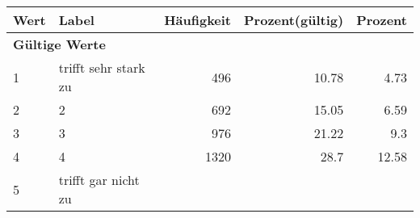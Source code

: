      \begin{longtable}{lXrrr}
     \toprule
     \textbf{Wert} & \textbf{Label} & \textbf{Häufigkeit} & \textbf{Prozent(gültig)} & \textbf{Prozent} \\
     \endhead
     \midrule
     \multicolumn{5}{l}{\textbf{Gültige Werte}}\\

     1 &
     \multicolumn{1}{X}{ trifft sehr stark zu   } &


       \num{496} &
       \num[round-mode=places,round-precision=2]{10.78} &
         \num[round-mode=places,round-precision=2]{4.73} \\

     2 &
     \multicolumn{1}{X}{ 2   } &


       \num{692} &
       \num[round-mode=places,round-precision=2]{15.05} &
         \num[round-mode=places,round-precision=2]{6.59} \\

     3 &
     \multicolumn{1}{X}{ 3   } &


       \num{976} &
       \num[round-mode=places,round-precision=2]{21.22} &
         \num[round-mode=places,round-precision=2]{9.3} \\

     4 &
     \multicolumn{1}{X}{ 4   } &


       \num{1320} &
       \num[round-mode=places,round-precision=2]{28.7} &
         \num[round-mode=places,round-precision=2]{12.58} \\

     5 &
     \multicolumn{1}{X}{ trifft gar nicht zu   } &



\end{longtable}
